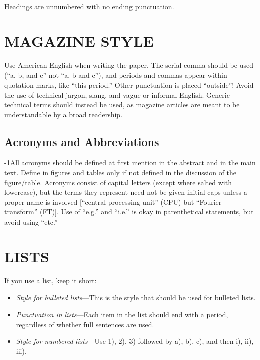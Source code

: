 \documentclass{IEEEcsmag}
\begin{document}
Headings are unnumbered with no ending punctuation.\vspace*{-5pt} 



\section{MAGAZINE STYLE}
Use American English when writing the paper. The serial comma should be used (``a, b, and c'' not ``a, b and c''), and periods and commas appear within quotation marks, like ``this period.'' Other punctuation is placed ``outside''! Avoid the use of technical jargon, slang, and vague or informal English. Generic technical terms should instead be used, as magazine articles are meant to be understandable by a broad readership.\vspace*{-5pt}



\subsection{Acronyms and Abbreviations}

\looseness-1All acronyms should be defined at first mention in the abstract and in the main text. Define in figures and tables only if not defined in the discussion of the figure/table. Acronyms consist of capital letters (except where salted with lowercase), but the terms they represent need not be given initial caps unless a proper name is involved [``central processing unit'' (CPU) but ``Fourier transform'' (FT)]. Use of ``e.g.'' and ``i.e.'' is okay in parenthetical statements, but avoid using ``etc.''


\section{LISTS}

If you use a list, keep it short:

\begin{itemize}
\item[{\ieeeguilsinglright}] {\it Style for bulleted lists}---This is the style that should be used for bulleted lists.
	
\item[{\ieeeguilsinglright}] {\it Punctuation in lists}---Each item in the list should end with a period, regardless of whether full sentences are used.

\item[{\ieeeguilsinglright}] {\it Style for numbered lists}---Use 1), 2), 3) followed by a), b), c), and then i), ii), iii).

\end{itemize}\vspace*{3pt}
\end{document}
